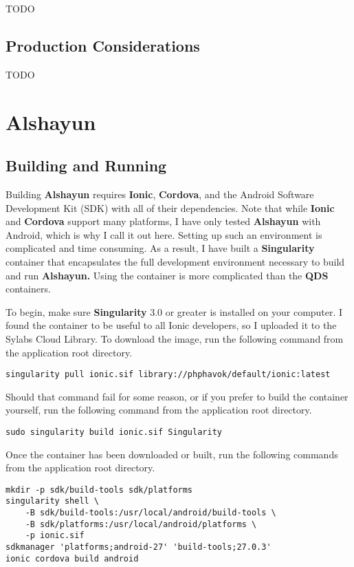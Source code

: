 \documentclass[12pt]{report}
\begin{document}
TODO

    \section{Production Considerations}
    
TODO

\chapter{Alshayun}

    \section{Building and Running}

Building \textbf{Alshayun} requires \textbf{Ionic}, \textbf{Cordova}, and the
Android Software Development Kit (SDK) with all of their dependencies. Note that
while \textbf{Ionic} and \textbf{Cordova} support many platforms, I have only
tested \textbf{Alshayun} with Android, which is why I call it out here. Setting
up such an environment is complicated and time consuming. As a result, I have
built a \textbf{Singularity} container that encapsulates the full development
environment necessary to build and run \textbf{Alshayun.} Using the container is
more complicated than the \textbf{QDS} containers.

To begin, make sure \textbf{Singularity} 3.0 \cite{singularity3inst} or greater
is installed on your computer. I found the container to be useful to all Ionic
developers, so I uploaded it to the Sylabs Cloud Library. To download the image,
run the following command from the application root directory.

\begin{verbatim}
singularity pull ionic.sif library://phphavok/default/ionic:latest
\end{verbatim}

Should that command fail for some reason, or if you prefer to build the
container yourself, run the following command from the application root
directory.

\begin{verbatim}
sudo singularity build ionic.sif Singularity
\end{verbatim}

Once the container has been downloaded or built, run the following commands from
the application root directory.

\begin{verbatim}
mkdir -p sdk/build-tools sdk/platforms
singularity shell \
    -B sdk/build-tools:/usr/local/android/build-tools \
    -B sdk/platforms:/usr/local/android/platforms \
    -p ionic.sif
sdkmanager 'platforms;android-27' 'build-tools;27.0.3'
ionic cordova build android
\end{verbatim}
\end{document}
